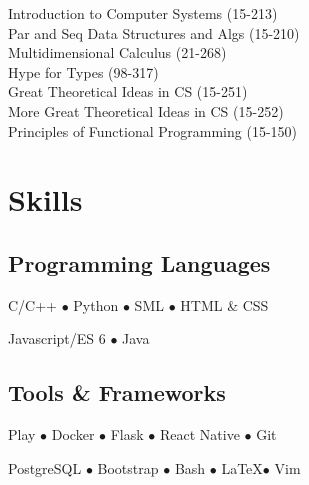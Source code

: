 \documentclass[]{openfont}
\begin{document}
\begin{minipage}[t]{0.40\textwidth}
Introduction to Computer Systems (15-213) \\
Par and Seq Data Structures and Algs (15-210) \\
Multidimensional Calculus (21-268) \\
Hype for Types (98-317) \\

Great Theoretical Ideas in CS (15-251) \\
More Great Theoretical Ideas in CS (15-252) \\
Principles of Functional Programming (15-150) \\
\sectionsep


\section{Skills}
\subsection{Programming Languages}
\vspace{\topsep}
C/C++ \(\bullet\)
Python \(\bullet\)
SML \(\bullet\)
HTML \& CSS

Javascript/ES 6 \(\bullet\)
Java

\sectionsep

\subsection{Tools \& Frameworks}
\vspace{\topsep}
Play \(\bullet\)
Docker \(\bullet\)
Flask \(\bullet\)
React Native \(\bullet\)
Git

PostgreSQL \(\bullet\)
Bootstrap \(\bullet\)
Bash \(\bullet\)
\LaTeX \(\bullet\)
Vim
\sectionsep

%
%

\end{minipage} 
\hfill
\end{document}
